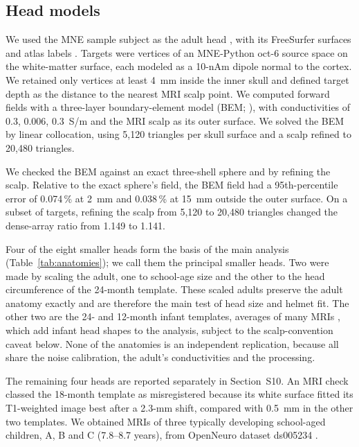 \documentclass[preprint,12pt,authoryear,a4paper]{elsarticle}
\begin{document}
\subsection{Head models}\label{sec:heads}

We used the MNE sample subject as the adult head \citep{gramfort2013}, with its FreeSurfer surfaces and atlas labels \citep{desikan2006,fischl2012}. Targets were vertices of an MNE-Python oct-6 source space on the white-matter surface, each modeled as a 10-nAm dipole normal to the cortex. We retained only vertices at least 4~mm inside the inner skull and defined target depth as the distance to the nearest MRI scalp point. We computed forward fields with a three-layer boundary-element model (BEM; \citealp{hamalainen1989}), with conductivities of 0.3, 0.006, 0.3~S/m and the MRI scalp as its outer surface. We solved the BEM by linear collocation, using 5,120 triangles per skull surface and a scalp refined to 20,480 triangles.

We checked the BEM against an exact three-shell sphere and by refining the scalp. Relative to the exact sphere's field, the BEM field had a 95th-percentile error of 0.074\,\% at 2~mm and 0.038\,\% at 15~mm outside the outer surface. On a subset of targets, refining the scalp from 5,120 to 20,480 triangles changed the dense-array ratio from 1.149 to 1.141.

Four of the eight smaller heads form the basis of the main analysis (Table~\ref{tab:anatomies}); we call them the principal smaller heads. Two were made by scaling the adult, one to school-age size and the other to the head circumference of the 24-month template. These scaled adults preserve the adult anatomy exactly and are therefore the main test of head size and helmet fit. The other two are the 24- and 12-month infant templates, averages of many MRIs \citep{oreilly2021,richards2016}, which add infant head shapes to the analysis, subject to the scalp-convention caveat below. None of the anatomies is an independent replication, because all share the noise calibration, the adult's conductivities and the processing.

The remaining four heads are reported separately in Section~S10. An MRI check classed the 18-month template as misregistered because its white surface fitted its T1-weighted image best after a 2.3-mm shift, compared with 0.5~mm in the other two templates. We obtained MRIs of three typically developing school-aged children, A, B and C (7.8–8.7 years), from OpenNeuro dataset ds005234 \citep{fadeev2024,fadeev2025}.
\end{document}
